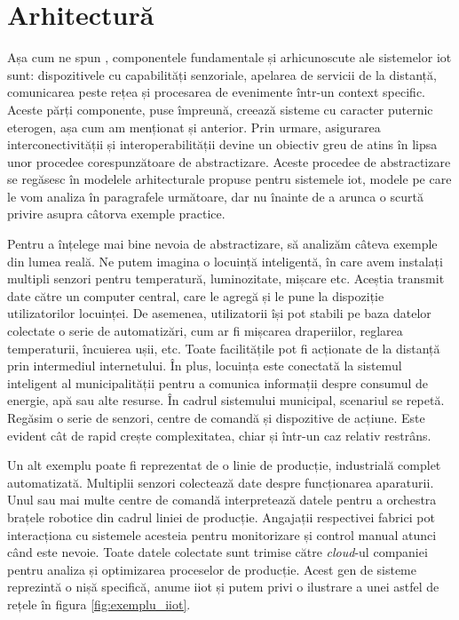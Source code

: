 
\section{Arhitectură}

Așa cum ne spun \citet{Khodadadi2016}, componentele fundamentale și arhicunoscute ale sistemelor \acrshort{iot} sunt: dispozitivele cu capabilități senzoriale, apelarea de servicii de la distanță, comunicarea peste rețea și procesarea de evenimente într-un context specific. Aceste părți componente, puse împreună, creează sisteme cu caracter puternic eterogen, așa cum am menționat și anterior. Prin urmare, asigurarea interconectivității și interoperabilității devine un obiectiv greu de atins în lipsa unor procedee corespunzătoare de abstractizare. Aceste procedee de abstractizare se regăsesc în modelele arhitecturale propuse pentru sistemele \acrshort{iot}, modele pe care le vom analiza în paragrafele următoare, dar nu înainte de a arunca o scurtă privire asupra câtorva exemple practice.

Pentru a înțelege mai bine nevoia de abstractizare, să analizăm câteva exemple din lumea reală. Ne putem imagina o locuință inteligentă, în care avem instalați multipli senzori pentru temperatură, luminozitate, mișcare etc. Aceștia transmit date către un computer central, care le agregă și le pune la dispoziție utilizatorilor locuinței. De asemenea, utilizatorii își pot stabili pe baza datelor colectate o serie de automatizări, cum ar fi mișcarea draperiilor, reglarea temperaturii, încuierea ușii, etc. Toate facilitățile pot fi acționate de la distanță prin intermediul internetului. În plus, locuința este conectată la sistemul inteligent al municipalității pentru a comunica informații despre consumul de energie, apă sau alte resurse. În cadrul sistemului municipal, scenariul se repetă. Regăsim o serie de senzori, centre de comandă și dispozitive de acțiune. Este evident cât de rapid crește complexitatea, chiar și într-un caz relativ restrâns.

Un alt exemplu poate fi reprezentat de o linie de producție, industrială complet automatizată. Multiplii senzori colectează date despre funcționarea aparaturii. Unul sau mai multe centre de comandă interpretează datele pentru a orchestra brațele robotice din cadrul liniei de producție. Angajații respectivei fabrici pot interacționa cu sistemele acesteia pentru monitorizare și control manual atunci când este nevoie. Toate datele colectate sunt trimise către \textit{cloud}-ul companiei pentru analiza și optimizarea proceselor de producție. Acest gen de sisteme reprezintă o nișă specifică, anume \acrfull{iiot} și putem privi o ilustrare a unei astfel de rețele în figura \ref{fig:exemplu_iiot}.

